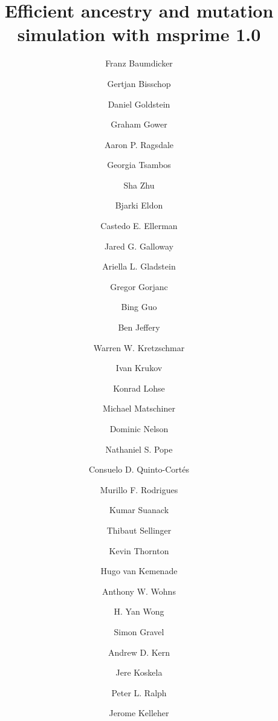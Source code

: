 \documentclass{article}
\begin{document}
\title{Efficient ancestry and mutation simulation with msprime 1.0}
\author[1,$\star$]{Franz Baumdicker}
\author[2,$\star$]{Gertjan Bisschop}
\author[3,$\star$]{Daniel Goldstein}
\author[4,$\star$]{Graham Gower}
\author[5,$\star$]{Aaron P. Ragsdale}
\author[6,$\star$]{Georgia Tsambos}
\author[7,$\star$]{Sha Zhu}

\author[8]{Bjarki Eldon}
\author[9]{Castedo E. Ellerman}
\author[10]{Jared G. Galloway}
\author[11,12]{Ariella L. Gladstein}
\author[13]{Gregor Gorjanc}
\author[14]{Bing Guo}
\author[7]{Ben Jeffery}
\author[15]{Warren W. Kretzschmar}
\author[16]{Ivan Krukov}
\author[2]{Konrad Lohse}
\author[17]{Michael Matschiner}
\author[16]{Dominic Nelson}
\author[18]{Nathaniel S. Pope}
\author[19]{Consuelo D. Quinto-Cort\'es}
\author[10]{Murillo F. Rodrigues}
\author[20]{Kumar Suanack}
\author[21]{Thibaut Sellinger}
\author[22]{Kevin Thornton}
\author[23]{Hugo van Kemenade}
\author[7]{Anthony W. Wohns}
\author[7]{H. Yan Wong}

\author[15,$\dagger$]{Simon Gravel}
\author[10,$\dagger$]{Andrew D. Kern}
\author[24,$\dagger$]{Jere Koskela}
\author[10,25,$\dagger$]{Peter L. Ralph}

\author[7,$\ddagger$]{Jerome Kelleher}

\end{document}
